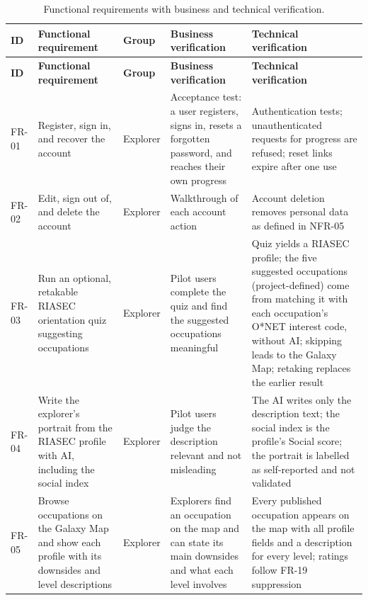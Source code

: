 {\small
\begin{longtable}{|>{\raggedright\arraybackslash}p{}|>{\raggedright\arraybackslash}p{}|>{\raggedright\arraybackslash}p{}|>{\raggedright\arraybackslash}p{}|>{\raggedright\arraybackslash}p{}|}
\caption{Functional requirements with business and technical verification.} \\
\hline
\textbf{ID} & \textbf{Functional requirement} & \textbf{Group} & \textbf{Business verification} & \textbf{Technical verification} \\ \hline
\endfirsthead
\hline
\textbf{ID} & \textbf{Functional requirement} & \textbf{Group} & \textbf{Business verification} & \textbf{Technical verification} \\ \hline
\endhead
FR-01 & Register, sign in, and recover the account & Explorer & Acceptance test: a user registers, signs in, resets a forgotten password, and reaches their own progress & Authentication tests; unauthenticated requests for progress are refused; reset links expire after one use \\ \hline
FR-02 & Edit, sign out of, and delete the account & Explorer & Walkthrough of each account action & Account deletion removes personal data as defined in NFR-05 \\ \hline
FR-03 & Run an optional, retakable RIASEC orientation quiz suggesting occupations\cite{r41} & Explorer & Pilot users complete the quiz and find the suggested occupations meaningful & Quiz yields a RIASEC profile; the five suggested occupations (project-defined) come from matching it with each occupation's O*NET interest code, without AI; skipping leads to the Galaxy Map; retaking replaces the earlier result \\ \hline
FR-04 & Write the explorer's portrait from the RIASEC profile with AI, including the social index & Explorer & Pilot users judge the description relevant and not misleading & The AI writes only the description text; the social index is the profile's Social score; the portrait is labelled as self-reported and not validated \\ \hline
FR-05 & Browse occupations on the Galaxy Map and show each profile with its downsides and level descriptions & Explorer & Explorers find an occupation on the map and can state its main downsides and what each level involves & Every published occupation appears on the map with all profile fields and a description for every level; ratings follow FR-19 suppression \\ \hline

\end{longtable}}

